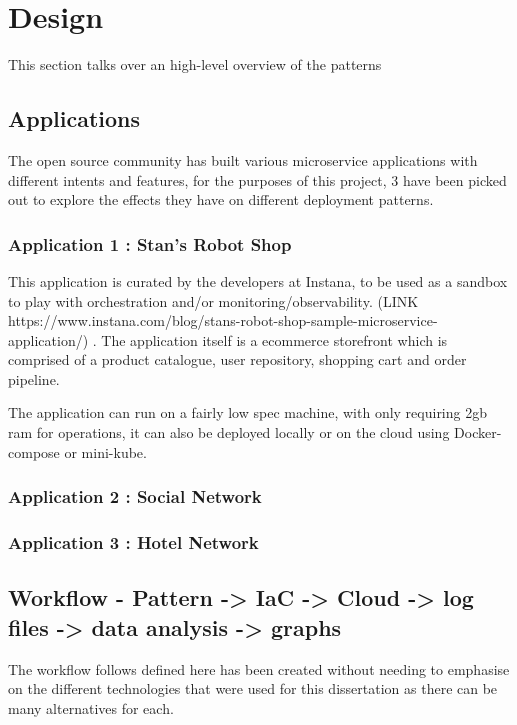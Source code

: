 \chapter{Design}

This section talks over an high-level overview of the patterns 

\section{Applications}
The open source community has built various microservice applications with different intents and features, for the purposes of this project, 3 have been picked out to explore the effects they have on different deployment patterns. 

\subsection{Application 1 : Stan’s Robot Shop}
This application is curated by the developers at Instana, to be used as a sandbox to play with orchestration and/or monitoring/observability. (LINK https://www.instana.com/blog/stans-robot-shop-sample-microservice-application/) . The application itself is a ecommerce storefront which is comprised of a product catalogue, user repository, shopping cart and order pipeline. 

The application can run on a fairly low spec machine, with only requiring 2gb ram for operations, it can also be deployed locally or on the cloud using Docker-compose or mini-kube.  

\subsection{Application 2 : Social Network}


\subsection{Application 3 : Hotel Network}



\section{Workflow - Pattern  -> IaC -> Cloud -> log files -> data analysis -> graphs }
The workflow follows defined here has been created without needing to emphasise on the different technologies that were used for this dissertation as there can be many alternatives for each. 

